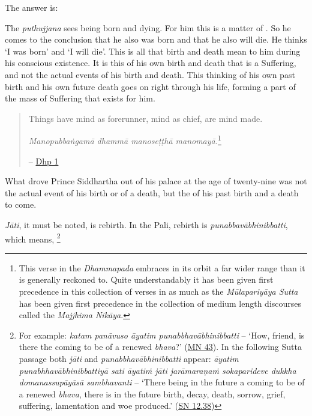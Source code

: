 \clearpage

The answer is:

The \emph{puthujjana} sees  being born and dying. For him this is a matter of . So he comes to the conclusion that he also was born and that he also will die. He thinks `I was born' and `I will die'. This is all that birth and death mean to him during his conscious existence. It is this  of his own birth and death that is a  Suffering, and not the actual events of his birth and death. This thinking of his own past birth and his own future death goes on right through his life, forming a part of the mass of Suffering that exists for him.

\begin{quote}
Things have mind as forerunner, mind as chief, are mind made.

\emph{Manopubbaṅgamā dhammā manoseṭṭhā manomayā.}\footnote{This verse in the \emph{Dhammapada} embraces in its orbit a far wider range than it is generally reckoned to. Quite understandably it has been given first precedence in this collection of verses in as much as the \emph{Mūlapariyāya Sutta} has been given first precedence in the collection of medium length discourses called the \emph{Majjhima Nikāya}.}

 -- \href{https://suttacentral.net/dhp1-20/en/anandajoti}{Dhp 1}
\end{quote}

What drove Prince Siddhartha out of his palace at the age of twenty-nine was not the actual event of his birth or of a death, but the  of his past birth and a death to come.

\clearpage

\emph{Jāti}, it must be noted, is  rebirth. In the Pali, rebirth is \emph{punabbavābhinibbatti}, which means, \footnote{For example: \emph{katam panāvuso āyatim punabbhavābhinibbatti} -- `How, friend, is there the coming to be of a renewed \emph{bhava}?' (\href{https://suttacentral.net/mn43/en/sujato}{MN 43}). In the following Sutta passage both \emph{jāti} and \emph{punabbhavābhinibbatti} appear: \emph{āyatim punabhhavābhinibbattiyā sati āyatiṁ jāti jarāmaraṇaṁ sokaparideve dukkha domanassupāyāsā sambhavanti} -- `There being in the future a coming to be of a renewed \emph{bhava}, there is in the future birth, decay, death, sorrow, grief, suffering, lamentation and woe produced.' (\href{https://suttacentral.net/sn12.38/en/bodhi}{SN 12.38})}

